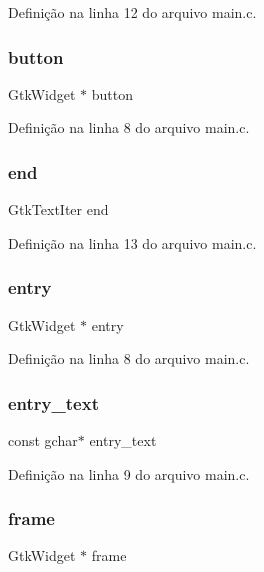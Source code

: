 Definição na linha 12 do arquivo main.\+c.

\mbox{\label{main_8c_ab7297ac5f98e1ddc9ed6024c8de09c5b}} 
\subsubsection{button}
{\footnotesize\ttfamily Gtk\+Widget $\ast$ button}



Definição na linha 8 do arquivo main.\+c.

\mbox{\label{main_8c_aa02d815c53125c96908e0a9f04c9b03e}} 
\subsubsection{end}
{\footnotesize\ttfamily Gtk\+Text\+Iter end}



Definição na linha 13 do arquivo main.\+c.

\mbox{\label{main_8c_a9624ba97a6fc595b5c24d65ab111ca4b}} 
\subsubsection{entry}
{\footnotesize\ttfamily Gtk\+Widget $\ast$ entry}



Definição na linha 8 do arquivo main.\+c.

\mbox{\label{main_8c_ae7a1014ce2ca9043b3db9f8e36ba2fdf}} 
\subsubsection{entry\+\_\+text}
{\footnotesize\ttfamily const gchar$\ast$ entry\+\_\+text}



Definição na linha 9 do arquivo main.\+c.

\mbox{\label{main_8c_ac763f113252a8839c19294bdc5e56cf1}} 
\subsubsection{frame}
{\footnotesize\ttfamily Gtk\+Widget $\ast$ frame}



